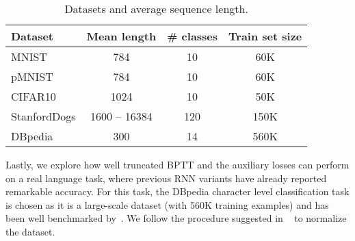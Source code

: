 \documentclass{article}
\begin{document}

\begin{table}[]
\caption{Datasets and average sequence length.}
\label{image_statistics}
\vskip 0.15in
\begin{center}
\begin{small}
\small
\begin{tabular}{lccc}
\toprule
Dataset & Mean length & \# classes & Train set size\\
\midrule
MNIST     & 784 &  10 & 60K\\
pMNIST  & 784 & 10 & 60K\\
CIFAR10 & 1024 & 10 & 50K\\
StanfordDogs\footnotemark  & 1600 -- 16384 & 120 & 150K\\
DBpedia & 300 & 14 & 560K\\
\bottomrule
\end{tabular}

\end{small}
\end{center}
\vskip -0.1in
\end{table}


Lastly, we explore how well truncated BPTT and the auxiliary losses can perform on a real language task, where previous RNN variants have already reported remarkable accuracy. For this task, the DBpedia character level classification task is chosen as it is a large-scale dataset (with 560K training examples) and has been well benchmarked by~\citet{dai2015semi}.
We follow the procedure suggested in ~\citet{zhang2015text} to normalize the dataset.
\end{document}
